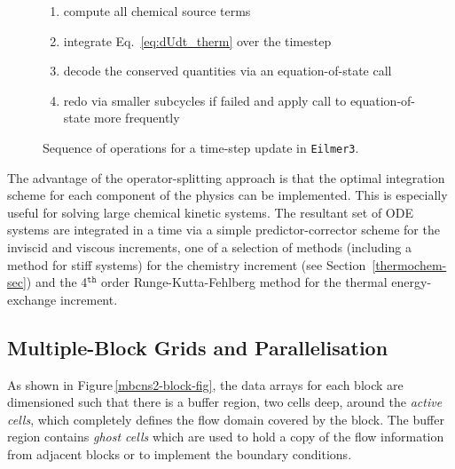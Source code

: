\begin{figure}[htbp]
\begin{center}
{{\begin{enumerate}
  \begin{enumerate}
   \item compute all chemical source terms
   \item integrate Eq.~\ref{eq:dUdt_therm} over the timestep
   \item decode the conserved quantities via an equation-of-state call
   \item redo via smaller subcycles if failed and apply call to equation-of-state more frequently
  \end{enumerate}
\end{enumerate}
}}
\end{center}
\caption{Sequence of operations for a time-step update in \texttt{Eilmer3}.}
\label{fig:mbcns-solve-procedure}
\end{figure}

\medskip
The advantage of the operator-splitting approach is that the optimal integration scheme 
for each component of the physics can be implemented.
This is especially useful for solving large chemical kinetic systems.
The resultant set of ODE systems are integrated in a time via a simple predictor-corrector scheme 
for the inviscid and viscous increments, 
one of a selection of methods (including a method for stiff systems) for the chemistry increment (see Section~\ref{thermochem-sec}) and 
the 4$^{\texttt{th}}$ order Runge-Kutta-Fehlberg method for the thermal energy-exchange increment.  


\subsection{Multiple-Block Grids and Parallelisation}
%
As shown in Figure\,\ref{mbcns2-block-fig}, the data arrays for each block are dimensioned such that
there is a buffer region, two cells deep, around the \textit{active cells},
which completely defines the flow domain covered by the block.
The buffer region contains \textit{ghost cells} which are used to hold a copy of the flow information
from adjacent blocks or to implement the boundary conditions.

